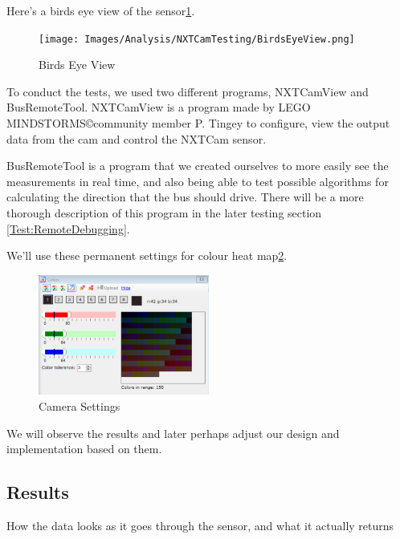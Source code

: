 Here's a birds eye view of the sensor\ref{fig:BirdsEyeView}.
\begin{figure}[H]
    \centering
    \texttt{[image: Images/Analysis/NXTCamTesting/BirdsEyeView.png]}
    \caption{Birds Eye View}
    \label{fig:BirdsEyeView}
\end{figure}



To conduct the tests, we used two different programs, NXTCamView and BusRemoteTool. 
NXTCamView is a program made by LEGO MINDSTORMS\copyright community member P. Tingey to configure, view the output data from the cam and control the NXTCam sensor. 

BusRemoteTool is a program that we created ourselves to more easily see the measurements in real time, and also being able to test possible algorithms for calculating the direction that the bus should drive. There will be a more thorough description of this program in the later testing section \ref{Test:RemoteDebugging}. 

We'll use these permanent settings for colour heat map\ref{fig:CamSettings}.
\begin{figure}[H]
    \centering
    \includegraphics[width=0.5\textwidth]{Images/Analysis/NXTCamTesting/NXTCamView_ColourSettings.png}
    \caption{Camera Settings}
    \label{fig:CamSettings}
\end{figure}



We will observe the results and later perhaps adjust our design and implementation based on them.

\subsection{Results}

How the data looks as it goes through the sensor, and what it actually returns



